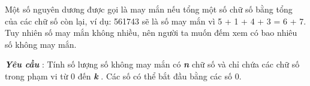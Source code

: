 Một số nguyên dương được gọi là may mắn nếu tổng một số chữ số bằng tổng của các chữ số còn lại, ví dụ: 561743 sẽ là số may mắn vì 5 + 1 + 4 + 3 = 6 + 7. Tuy nhiên số may mắn không nhiều, nên người ta muốn đếm xem có bao nhiêu số không may mắn.  

\textbf{\emph{     Yêu cầu    }}   : Tính số lượng số không may mắn có   \textbf{\emph{     n    }}   chữ số và chỉ chứa các chữ số trong phạm vi từ 0 đến   \textbf{\emph{     k    }}   . Các số có thể bắt đầu bằng các số 0.
